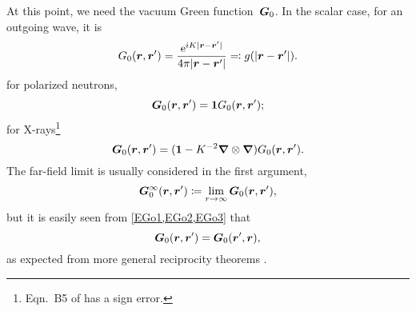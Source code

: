 At this point, we need the vacuum Green function~$\bm{G}_0$.
In the scalar case, for an outgoing wave, it is
\begin{equation}\label{EGo1}
  G_0(\r,\r') = \frac{\e^{iK|\r-\r'|}}{4\pi|\r-\r'|}
  \eqqcolon g(|\r-\r'|).
\end{equation}
for polarized neutrons,
\begin{equation}\label{EGo2}
  \TGo(\r,\r') = \v1 G_0(\r,\r');
\end{equation}
for X-rays\footnote{Eqn.~B5 of \cite{DiWa84} has a sign error.}
\begin{equation}\label{EGo3}
  \TGo(\r,\r') = (\v1 -K^{-2}\Nabla\otimes\Nabla) G_0(\r,\r').
\end{equation}
The far-field limit is usually considered in the first argument,
\begin{equation}\label{EGinftydef}
  \TGo^\infty(\r,\r')\coloneqq \lim_{r\to\infty} \TGo(\r,\r'),
\end{equation}
but it is easily seen from \cref{EGo1,EGo2,EGo3} that
\begin{equation}\label{EGoReci}
  \TGo(\r,\r')=\TGo(\r',\r),
\end{equation}
as expected from more general reciprocity theorems \cite{Pot04}.

